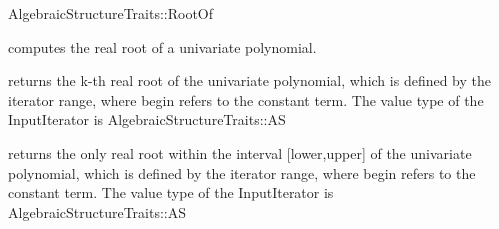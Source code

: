 \begin{ccRefConcept}{AlgebraicStructureTraits::RootOf}

\begin{ccAdvanced}
\ccDefinition

 computes the real root of a univariate polynomial.
 
\ccRefines 


\ccTypes


\ccOperations
{}
        {returns the k-th real root of the univariate polynomial, 
        which is defined by the iterator range, 
        where begin refers to the constant term. 
        \ccPrecond The value type of the InputIterator is AlgebraicStructureTraits::AS\\ }

        {returns the only real root within the interval [lower,upper] 
        of the univariate polynomial, which is defined by the iterator 
        range, where begin refers to the constant term. 
        \ccPrecond The value type of the InputIterator is AlgebraicStructureTraits::AS\\ 
}


\ccSeeAlso


\end{ccAdvanced}
\end{ccRefConcept} 